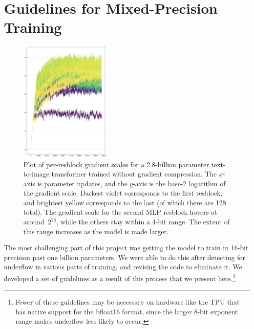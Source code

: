 \documentclass{article}
\begin{document}
\section{Guidelines for Mixed-Precision Training}
\label{sec:mp_train_guidelines}
%
\begin{figure}[t]
    \centering
    \includegraphics[width=0.4\textwidth]{grad_scale_plot.png}
    \caption{Plot of per-resblock gradient scales for a 2.8-billion parameter text-to-image transformer trained without gradient compression. The $x$-axis is parameter updates, and the $y$-axis is the base-2 logarithm of the gradient scale. Darkest violet corresponds to the first resblock, and brightest yellow corresponds to the last (of which there are 128 total). The gradient scale for the second MLP resblock hovers at around~$2^{24}$, while the others stay within a 4-bit range. The extent of this range increases as the model is made larger.}
    \label{fig:grad_scale_plot}
\end{figure}
%
The most challenging part of this project was getting the model to train in 16-bit precision past one billion parameters. We were able to do this after detecting for underflow in various parts of training, and revising the code to eliminate it. We developed a set of guidelines as a result of this process that we present here.\footnote{Fewer of these guidelines may be necessary on hardware like the TPU that has native support for the bfloat16 format, since the larger 8-bit exponent range makes underflow less likely to occur.}
\end{document}
